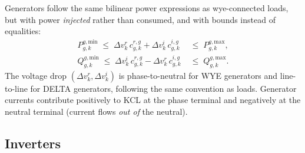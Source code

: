 \documentclass[11pt,a4paper]{article}
\newcommand{\dvr}{\Delta v^r}
\newcommand{\dvi}{\Delta v^i}
\begin{document}
Generators follow the same bilinear power expressions as wye-connected loads,
but with power \emph{injected} rather than consumed, and with bounds instead of
equalities:
%
\begin{align}
  P^{g,\text{min}}_{g,k}
  \;\leq\; \dvr_k\,c^{r,g}_{g,k} + \dvi_k\,c^{i,g}_{g,k}
  &\;\leq\; P^{g,\text{max}}_{g,k},
  \label{eq:gen-p}\\
  Q^{g,\text{min}}_{g,k}
  \;\leq\; \dvi_k\,c^{r,g}_{g,k} - \dvr_k\,c^{i,g}_{g,k}
  &\;\leq\; Q^{g,\text{max}}_{g,k}.
  \label{eq:gen-q}
\end{align}
%
The voltage drop $(\dvr_k, \dvi_k)$ is phase-to-neutral for WYE generators and
line-to-line for DELTA generators, following the same convention as loads.
Generator currents contribute positively to KCL at the phase terminal and
negatively at the neutral terminal (current flows \emph{out of} the neutral).

\subsection{Inverters}
\label{sec:inverters}
\end{document}

